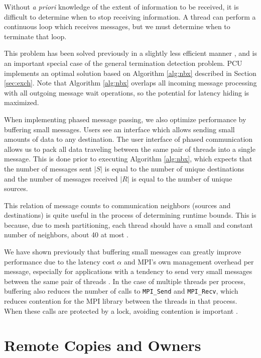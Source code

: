 Without {\it a priori} knowledge of the extent of information to be
received, it is difficult to determine when to stop receiving
information.
A thread can perform a continuous loop which receives messages,
but we must determine when to terminate that loop.

This problem has been solved previously in a slightly less efficient
manner \cite{ovcharenko2012neighborhood}, and is an important special case
of the general termination detection problem.
PCU implements an optimal solution based on Algorithm \ref{alg:nbx}
described in Section \ref{sec:exch}.
Note that Algorithm \ref{alg:nbx} overlaps all incoming message processing
with all outgoing message wait operations, so the potential for latency
hiding is maximized.

When implementing phased message passing, we also optimize performance
by buffering small messages.
Users see an interface which allows sending small amounts of data to
any destination.
The user interface of phased communication allows us to pack
all data traveling between the same pair of threads into a single message.
This is done prior to executing Algorithm \ref{alg:nbx}, which expects
that the number of messages sent $|S|$ is equal to the number of unique
destinations and the number of messages received $|R|$ is equal to the number
of unique sources.

This relation of message counts to communication neighbors (sources and
destinations) is quite useful in the process of determining runtime bounds.
This is because, due to mesh partitioning, each thread should have a small
and constant number of neighbors,
about 40 at most \cite{zhou2010petascale}.

We have shown previously that buffering small messages can greatly improve performance
due to the latency cost $\alpha$ and MPI's own management overhead per message,
especially for applications
with a tendency to send very small messages between the same pair of threads
\cite{ovcharenko2012neighborhood}.
In the case of multiple threads per process, buffering also reduces
the number of calls to \texttt{MPI\_Send} and \texttt{MPI\_Recv}, which reduces
contention for the MPI library between the threads in that process.
When these calls are protected by a lock, avoiding contention is important
\cite{mavriplis2002parallel}.

\section{Remote Copies and Owners}
\label{sec:remotes}

